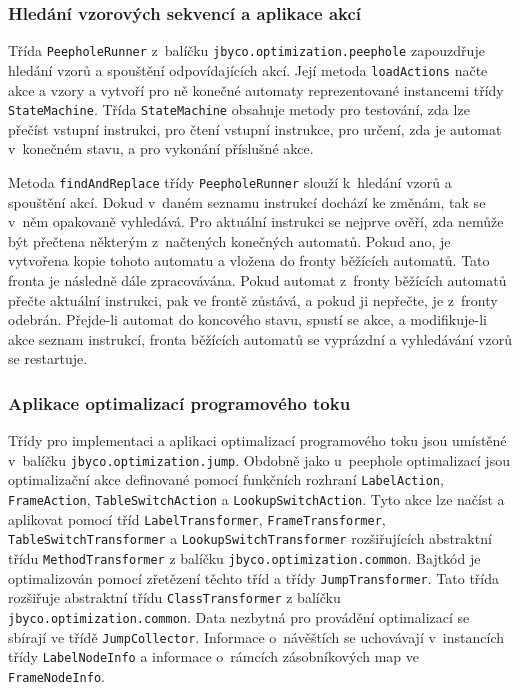 \subsubsection{Hledání vzorových sekvencí a aplikace akcí}

Třída \texttt{PeepholeRunner} z~balíčku \texttt{jbyco.optimization.peephole} zapouzdřuje hledání vzorů a spouštění odpovídajících akcí. Její metoda \texttt{loadActions} načte akce a vzory a vytvoří pro ně konečné automaty reprezentované instancemi třídy \texttt{StateMachine}. Třída \texttt{StateMachine} obsahuje metody pro testování, zda lze přečíst vstupní instrukci, pro čtení vstupní instrukce, pro určení, zda je automat v~konečném stavu, a pro vykonání příslušné akce. 

Metoda \texttt{findAndReplace} třídy \texttt{PeepholeRunner} slouží k~hledání vzorů a spouštění akcí. Dokud v~daném seznamu instrukcí dochází ke změnám, tak se v~něm opakovaně vyhledává. Pro aktuální instrukci se nejprve ověří, zda nemůže být přečtena některým z~načtených konečných automatů. Pokud ano, je vytvořena kopie tohoto automatu a vložena do fronty běžících automatů. Tato fronta je následně dále zpracovávána. Pokud automat z~fronty běžících automatů přečte aktuální instrukci, pak ve frontě zůstává, a pokud ji nepřečte, je z~fronty odebrán. Přejde-li automat do koncového stavu, spustí se akce, a modifikuje-li akce seznam instrukcí, fronta běžících automatů se vyprázdní a vyhledávání vzorů se restartuje.

\subsubsection{Aplikace optimalizací programového toku}

Třídy pro implementaci a aplikaci optimalizací programového toku jsou umístěné v~balíčku \texttt{jbyco.optimization.jump}. Obdobně jako u~peephole optimalizací jsou optimalizační akce definované pomocí funkčních rozhraní \texttt{LabelAction}, \texttt{FrameAction}, \texttt{TableSwitchAction} a \texttt{LookupSwitchAction}. Tyto akce lze načíst a aplikovat pomocí tříd \texttt{LabelTransformer}, \texttt{FrameTransformer}, \texttt{TableSwitchTransformer} a \texttt{LookupSwitchTransformer} rozšiřujících abstraktní třídu \texttt{MethodTransformer} z balíčku \texttt{jbyco.optimization.common}.
Bajtkód je optimalizován pomocí zřetězení těchto tříd a třídy \texttt{JumpTransformer}. Tato třída rozšiřuje abstraktní třídu \texttt{ClassTransformer} z balíčku \texttt{jbyco.optimization.common}.
Data nezbytná pro provádění optimalizací se sbírají ve třídě \texttt{JumpCollector}. Informace o~návěštích se uchovávají v~instancích třídy \texttt{LabelNodeInfo} a informace o~rámcích zásobníkových map ve \texttt{FrameNodeInfo}.


